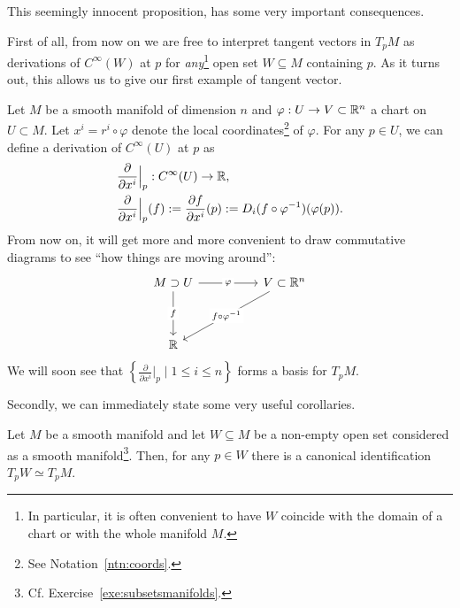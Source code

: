 This seemingly innocent proposition, has some very important consequences.

First of all, from now on we are free to interpret tangent vectors in $T_p M$ as derivations of $C^\infty(W)$ at $p$ for \emph{any}\footnote{In particular, it is often convenient to have $W$ coincide with the domain of a chart or with the whole manifold $M$.} open set $W\subseteq M$ containing $p$.
As it turns out, this allows us to give our first example of tangent vector.

\begin{example}\label{ex:partialderivative}
	Let $M$ be a smooth manifold of dimension $n$ and $\varphi: U \to V\subset\mathbb{R}^n$ a chart on $U\subset M$.
	Let $x^i = r^i \circ \varphi$ denote the local coordinates\footnote{See Notation~\ref{ntn:coords}.} of $\varphi$.
	For any $p\in U$, we can define a derivation of $C^\infty(U)$ at $p$ as
	\begin{align}
		 & \frac{\partial}{\partial x^i}\Big|_p : C^\infty(U) \to \mathbb{R},                                                             \\
		 & \frac{\partial}{\partial x^i}\Big|_p (f) := \frac{\partial f}{\partial x^i}(p) := D_i(f\circ\varphi^{-1})(\varphi(p)).
	\end{align}
	From now on, it will get more and more convenient to draw commutative diagrams to see ``how things are moving around'':
	\begin{equation}
		\begin{tikzcd}[column sep = huge, row sep = huge]
			M\supset U \arrow[r, "\varphi" description] \arrow[d, "f" description] & V \subset\R^n \arrow [dl, "f\circ\varphi^{-1}" description]\\
			\R &
		\end{tikzcd}
	\end{equation}
	We will soon see that $\left\{\frac{\partial}{\partial x^i}\Big|_p \mid 1\leq i\leq n\right\}$ forms a basis for $T_p M$.
\end{example}

Secondly, we can immediately state some very useful corollaries.

\begin{corollary}\label{cor:tgsubspace}
	Let $M$ be a smooth manifold and let $W\subseteq M$ be a non-empty open set considered as a smooth manifold\footnote{Cf. Exercise~\ref{exe:subsetsmanifolds}.}.
	Then, for any $p\in W$ there is a canonical identification $T_p W \simeq T_p M$.
\end{corollary}

